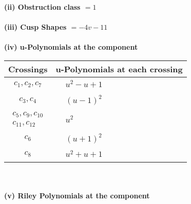 \documentclass[1p]{elsarticle_modified}
\theoremstyle{definition}
\begin{document}
\flushleft \textbf{(ii) Obstruction class $= 1$}\\~\\
\flushleft \textbf{(iii) Cusp Shapes $= -4 v-11$}\\~\\
\newpage\renewcommand{\arraystretch}{1}
\flushleft \textbf{(iv) u-Polynomials at the component}\newline \\
\begin{tabular}{m{50pt}|m{274pt}}
Crossings & \hspace{64pt}u-Polynomials at each crossing \\
\hline $$\begin{aligned}c_{1},c_{2},c_{7}\end{aligned}$$&$\begin{aligned}
&u^2- u+1
\end{aligned}$\\
\hline $$\begin{aligned}c_{3},c_{4}\end{aligned}$$&$\begin{aligned}
&(u-1)^2
\end{aligned}$\\
\hline $$\begin{aligned}c_{5},c_{9},c_{10}\\c_{11},c_{12}\end{aligned}$$&$\begin{aligned}
&u^2
\end{aligned}$\\
\hline $$\begin{aligned}c_{6}\end{aligned}$$&$\begin{aligned}
&(u+1)^2
\end{aligned}$\\
\hline $$\begin{aligned}c_{8}\end{aligned}$$&$\begin{aligned}
&u^2+u+1
\end{aligned}$\\
\hline
\end{tabular}\\~\\
\newpage\renewcommand{\arraystretch}{1}
\flushleft \textbf{(v) Riley Polynomials at the component}\newline \\
\end{document}
